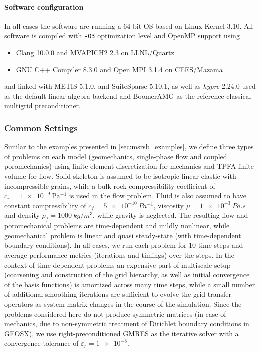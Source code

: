 \paragraph{Software configuration}
In all cases the software are running a 64-bit OS based on Linux Kernel 3.10.   All software is compiled with \texttt{-O3} optimization level and OpenMP support using
\begin{itemize}
\item Clang 10.0.0 and MVAPICH2 2.3 on LLNL/Quartz
\item GNU C++ Compiler 8.3.0 and Open MPI 3.1.4 on CEES/Mazama
\end{itemize} 
and linked with METIS 5.1.0, and SuiteSparse 5.10.1, as well as \textit{hypre} 2.24.0 used as the default linear algebra backend and BoomerAMG \cite{Henson2002} as the reference classical multigrid preconditioner.

\subsubsection{Common Settings}

Similar to the examples presented in \cref{sec:msrsb_examples}, we define three types of problems on each model (geomechanics, single-phase flow and coupled poromechanics) using finite element discretization for mechanics and TPFA finite volume for flow.   Solid skeleton is assumed to be isotropic linear elastic with incompressible grains, while a bulk rock compressibility coefficient of $c_r = \qty{1e-9}{\Pa^{-1}}$ is used in the flow problem.   Fluid is also assumed to have constant compressibility of $c_f = \qty{5e-10}{Pa^{-1}}$, viscosity $\mu = \qty{1e-3}{Pa.s}$ and density $\rho_f = \qty{1000}{kg/m^3}$, while gravity is neglected.   The resulting flow and poromechanical problems are time-dependent and mildly nonlinear, while geomechanical problem is linear and quasi steady-state (with time-dependent boundary conditions).   In all cases, we run each problem for 10 time steps and average performance metrics (iterations and timings) over the steps.   In the context of time-dependent problems an expensive part of multiscale setup (coarsening and construction of the grid hierarchy, as well as initial convergence of the basis functions) is amortized across many time steps, while a small number of additional smoothing iterations are sufficient to evolve the grid transfer operators as system matrix changes in the course of the simulation.   Since the problems considered here do not produce symmetric matrices (in case of mechanics, due to non-symmetric treatment of Dirichlet boundary conditions in GEOSX), we use right-preconditioned GMRES as the iterative solver with a convergence tolerance of $\varepsilon_r = \num{1e-8}$.

